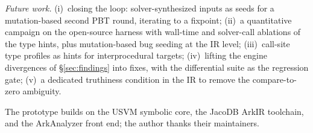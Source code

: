 \documentclass[sigconf,nonacm,screen]{acmart}
\begin{document}
\emph{Future work.} (i)~closing the loop: solver-synthesized inputs as
seeds for a mutation-based second PBT round, iterating to a fixpoint;
(ii)~a quantitative campaign on the open-source harness with wall-time and
solver-call ablations of the type hints, plus mutation-based bug seeding at
the IR level; (iii)~call-site type profiles as hints for interprocedural
targets; (iv)~lifting the engine divergences of \S\ref{sec:findings} into
fixes, with the differential suite as the regression gate; (v)~a dedicated
truthiness condition in the IR to remove the compare-to-zero ambiguity.

\begin{acks}
The prototype builds on the USVM symbolic core, the JacoDB ArkIR toolchain,
and the ArkAnalyzer front end; the author thanks their maintainers.
\end{acks}



\end{document}
